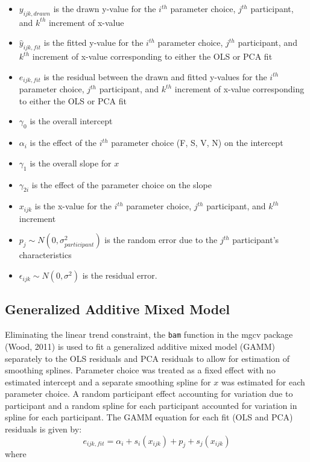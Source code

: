 \begin{appendix}
\begin{itemize}
\tightlist
\item
  \(y_{ijk,drawn}\) is the drawn y-value for the \(i^{th}\) parameter
  choice, \(j^{th}\) participant, and \(k^{th}\) increment of x-value
\item
  \(\hat y_{ijk,fit}\) is the fitted y-value for the \(i^{th}\)
  parameter choice, \(j^{th}\) participant, and \(k^{th}\) increment of
  x-value corresponding to either the OLS or PCA fit
\item
  \(e_{ijk,fit}\) is the residual between the drawn and fitted y-values
  for the \(i^{th}\) parameter choice, \(j^{th}\) participant, and
  \(k^{th}\) increment of x-value corresponding to either the OLS or PCA
  fit
\item
  \(\gamma_0\) is the overall intercept
\item
  \(\alpha_i\) is the effect of the \(i^{th}\) parameter choice (F, S,
  V, N) on the intercept
\item
  \(\gamma_1\) is the overall slope for \(x\)
\item
  \(\gamma_{2i}\) is the effect of the parameter choice on the slope
\item
  \(x_{ijk}\) is the x-value for the \(i^{th}\) parameter choice,
  \(j^{th}\) participant, and \(k^{th}\) increment
\item
  \(p_{j} \sim N(0, \sigma^2_{participant})\) is the random error due to
  the \(j^{th}\) participant's characteristics
\item
  \(\epsilon_{ijk} \sim N(0, \sigma^2)\) is the residual error.
\end{itemize}

\hypertarget{generalized-additive-mixed-model}{%
\subsection{\texorpdfstring{Generalized Additive Mixed Model
\label{app:gamm-equation}}{Generalized Additive Mixed Model }}\label{generalized-additive-mixed-model}}

Eliminating the linear trend constraint, the \texttt{bam} function in
the mgcv package (Wood, 2011) is used to fit a generalized additive
mixed model (GAMM) separately to the OLS residuals and PCA residuals to
allow for estimation of smoothing splines. Parameter choice was treated
as a fixed effect with no estimated intercept and a separate smoothing
spline for \(x\) was estimated for each parameter choice. A random
participant effect accounting for variation due to participant and a
random spline for each participant accounted for variation in spline for
each participant. The GAMM equation for each fit (OLS and PCA) residuals
is given by: \begin{equation}
e_{ijk,fit} = \alpha_i + s_{i}(x_{ijk}) + p_{j} + s_{j}(x_{ijk})
\end{equation} \noindent where


\end{appendix}

